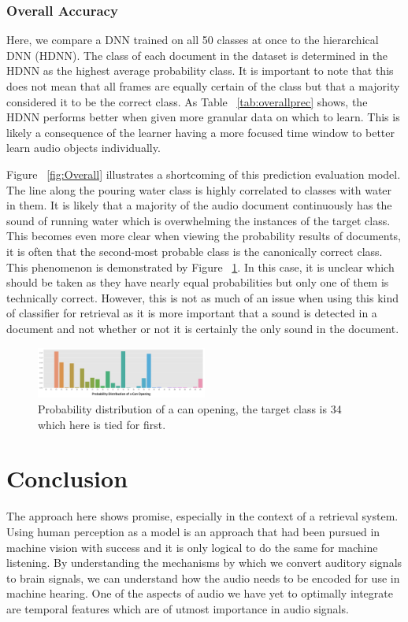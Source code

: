 \subsubsection{Overall Accuracy}
Here, we compare a DNN trained on all 50 classes at once to the hierarchical DNN (HDNN). The class of each document in the dataset is determined in the HDNN as the highest average probability class. It is important to note that this does not mean that all frames are equally certain of the class but that a majority considered it to be the correct class. As Table ~\ref{tab:overallprec} shows, the HDNN performs better when given more granular data on which to learn. This is likely a consequence of the learner having a more focused time window to better learn audio objects individually.

Figure ~\ref{fig:Overall} illustrates a shortcoming of this prediction evaluation model. The line along the pouring water class is highly correlated to classes with water in them. It is likely that a majority of the audio document continuously has the sound of running water which is overwhelming the instances of the target class. This becomes even more clear when viewing the probability results of documents, it is often that the second-most probable class is the canonically correct class. This phenomenon is demonstrated by Figure ~\ref{fig:probChart}. In this case, it is unclear which should be taken as they have nearly equal probabilities but only one of them is technically correct. However, this is not as much of an issue when using this kind of classifier for retrieval as it is more important that a sound is detected in a document and not whether or not it is certainly the only sound in the document.

\begin{figure}[h]
    \includegraphics[width=0.50\textwidth]{figures/probchart.png}
    \caption{Probability distribution of a can opening, the target class is 34 which here is tied for first.}
    \label{fig:probChart}
\end{figure}

\section{Conclusion}
The approach here shows promise, especially in the context of a retrieval system. Using human perception as a model is an approach that had been pursued in machine vision with success and it is only logical to do the same for machine listening. By understanding the mechanisms by which we convert auditory signals to brain signals, we can understand how the audio needs to be encoded for use in machine hearing. One of the aspects of audio we have yet to optimally integrate are temporal features which are of utmost importance in audio signals.


